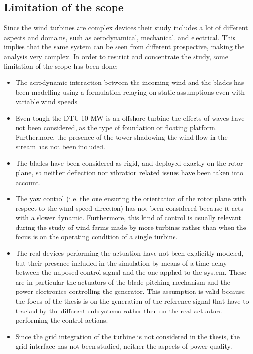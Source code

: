 \subsection{Limitation of the scope}\label{subsec:limitation_of_scope}
Since the wind turbines are complex devices their study includes a lot of different aspects and domains, such as aerodynamical, mechanical, and electrical. This implies that the same system can be seen from different prospective, making the analysis very complex. In order to restrict and concentrate the study, some limitation of the scope has been done:
\begin{itemize}
  \item The aerodynamic interaction between the incoming wind and the blades has been modelling using a formulation relaying on static assumptions even with variable wind speeds.
  \item Even tough the DTU 10 MW is an offshore turbine the effects of waves have not been considered, as the type of foundation or floating platform. Furthermore, the presence of the tower shadowing the wind flow in the stream has not been included.
  \item The blades have been considered as rigid, and deployed exactly on the rotor plane, so neither deflection nor vibration related issues have been taken into account.
  \item The yaw control (i.e. the one ensuring the orientation of the rotor plane with respect to the wind speed direction) has not been considered because it acts with a slower dynamic. Furthermore, this kind of control is usually relevant during the study of wind farms made by more turbines rather than when the focus is on the operating condition of a single turbine. 
  \item The real devices performing the actuation have not been explicitly modeled, but their presence included in the simulation by means of a time delay between the imposed control signal and the one applied to the system. These are in particular the actuators of the blade pitching mechanism and the power electronics controlling the generator. This assumption is valid because the focus of the thesis is on the generation of the reference signal that have to tracked by the different subsystems rather then on the real actuators performing the control actions.
  \item Since the grid integration of the turbine is not considered in the thesis, the grid interface has not been studied, neither the aspects of power quality.    
\end{itemize}